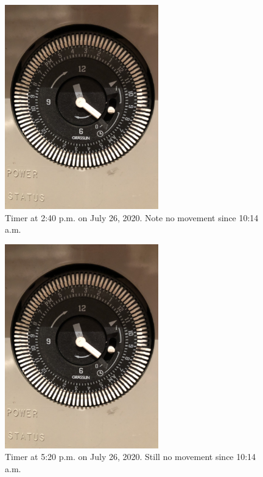 \documentclass[letterpaper,12pt]{texMemo}
\begin{document}
\begin{figure}
  \includegraphics[width=\linewidth,angle=-90,origin=c,height=3.5in]{images/20200726T1440.jpg}
  \caption{Timer at 2:40 p.m. on July 26, 2020. Note no movement since 10:14 a.m.}
  \label{Figure 3}
\end{figure}

\begin{figure}
  \includegraphics[width=\linewidth,angle=-90,origin=c,height=3.5in]{images/20200726T1440.jpg}
  \caption{Timer at 5:20 p.m. on July 26, 2020. Still no movement since 10:14 a.m.}
  \label{Figure 4}
\end{figure}
\end{document}

